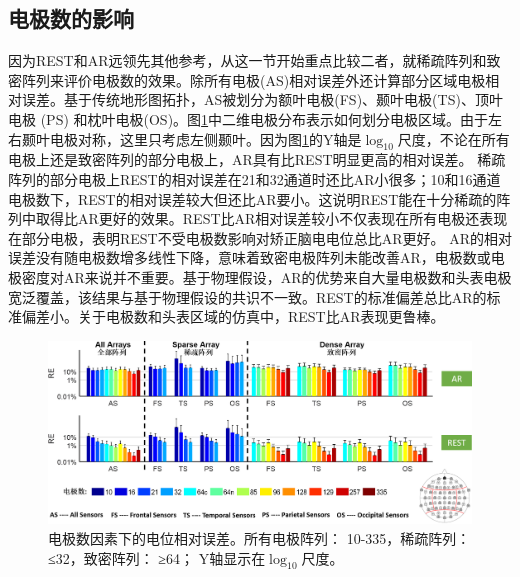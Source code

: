 \subsection{电极数的影响}
因为REST和AR远领先其他参考，从这一节开始重点比较二者，就稀疏阵列和致密阵列来评价电极数的效果。除所有电极(AS)相对误差外还计算部分区域电极相对误差。基于传统地形图拓扑，AS被划分为额叶电极(FS)、颞叶电极(TS)、顶叶电极 (PS) 和枕叶电极(OS)。图\ref{2:chn}中二维电极分布表示如何划分电极区域。由于左右颞叶电极对称，这里只考虑左侧颞叶。因为图\ref{2:chn}的Y轴是$\log_{10}$尺度，不论在所有电极上还是致密阵列的部分电极上，AR具有比REST明显更高的相对误差。 稀疏阵列的部分电极上REST的相对误差在21和32通道时还比AR小很多；10和16通道电极数下，REST的相对误差较大但还比AR要小。这说明REST能在十分稀疏的阵列中取得比AR更好的效果。REST比AR相对误差较小不仅表现在所有电极还表现在部分电极，表明REST不受电极数影响对矫正脑电电位总比AR更好。
AR的相对误差没有随电极数增多线性下降，意味着致密电极阵列未能改善AR，电极数或电极密度对AR来说并不重要。基于物理假设，AR的优势来自大量电极数和头表电极宽泛覆盖，该结果与基于物理假设的共识不一致。REST的标准偏差总比AR的标准偏差小。关于电极数和头表区域的仿真中，REST比AR表现更鲁棒。
\bigskip
\begin{figure}[!ht]
	\centering
	\includegraphics[width=15cm]{pic/JNE/figure4.png}
	\caption{电极数因素下的电位相对误差。所有电极阵列： 10-335，稀疏阵列： ≤32，致密阵列： ≥64； Y轴显示在$\log_{10}$尺度。}
	\label{2:chn}
\end{figure}
\bigskip

